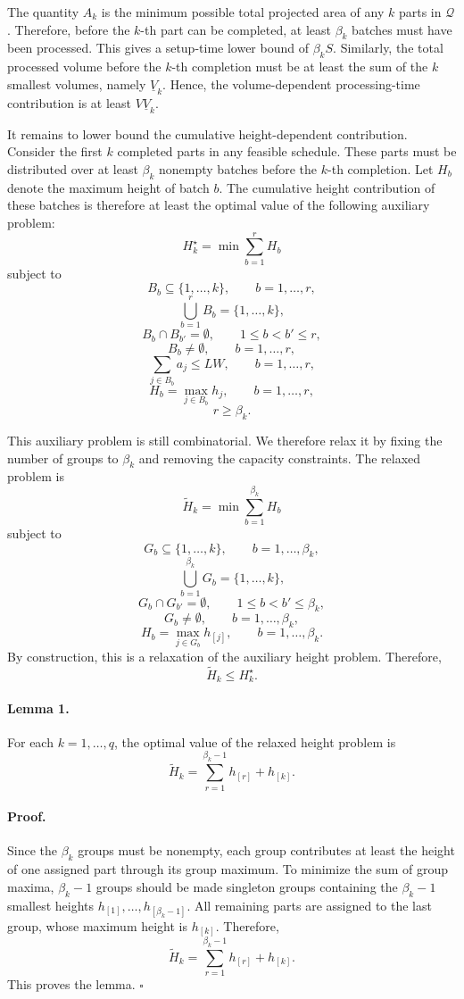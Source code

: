 \documentclass[letterpaper, 10 pt, conference]{ieeeconf}  %
\newcounter{lemma}
\begin{document}
The quantity $A_k$ is the minimum possible total projected area of any
$k$ parts in $\mathcal{Q}$. Therefore, before the $k$-th part can be
completed, at least $\beta_k$ batches must have been processed. This gives
a setup-time lower bound of $\beta_k S$. Similarly, the total processed
volume before the $k$-th completion must be at least the sum of the
$k$ smallest volumes, namely $\underline{V}_k$. Hence, the volume-dependent
processing-time contribution is at least $V\underline{V}_k$.

It remains to lower bound the cumulative height-dependent contribution.
Consider the first $k$ completed parts in any feasible schedule. These
parts must be distributed over at least $\beta_k$ nonempty batches before
the $k$-th completion. Let $H_b$ denote the maximum height of batch $b$.
The cumulative height contribution of these batches is therefore at least
the optimal value of the following auxiliary problem:
\[
H_k^{\star}
=
\min
\sum_{b=1}^{r}H_b
\]
subject to
\[
B_b\subseteq\{1,\dots,k\},\qquad b=1,\dots,r,
\]
\[
\bigcup_{b=1}^{r}B_b=\{1,\dots,k\},
\]
\[
B_b\cap B_{b'}=\emptyset,\qquad 1\le b<b'\le r,
\]
\[
B_b\neq\emptyset,\qquad b=1,\dots,r,
\]
\[
\sum_{j\in B_b}a_j\le LW,\qquad b=1,\dots,r,
\]
\[
H_b=\max_{j\in B_b}h_j,\qquad b=1,\dots,r,
\]
\[
r\ge \beta_k.
\]

This auxiliary problem is still combinatorial. We therefore relax it by
fixing the number of groups to $\beta_k$ and removing the capacity
constraints. The relaxed problem is
\[
\widetilde{H}_k
=
\min
\sum_{b=1}^{\beta_k}H_b
\]
subject to
\[
G_b\subseteq\{1,\dots,k\},\qquad b=1,\dots,\beta_k,
\]
\[
\bigcup_{b=1}^{\beta_k}G_b=\{1,\dots,k\},
\]
\[
G_b\cap G_{b'}=\emptyset,\qquad 1\le b<b'\le \beta_k,
\]
\[
G_b\neq\emptyset,\qquad b=1,\dots,\beta_k,
\]
\[
H_b=\max_{j\in G_b}h_{[j]},\qquad b=1,\dots,\beta_k.
\]
By construction, this is a relaxation of the auxiliary height problem.
Therefore,
\[
\widetilde{H}_k\le H_k^{\star}.
\]

\paragraph*{Lemma 1.}
For each $k=1,\dots,q$, the optimal value of the relaxed height problem is
\[
\widetilde{H}_k
=
\sum_{r=1}^{\beta_k-1}h_{[r]}+h_{[k]}.
\]

\paragraph*{Proof.}
Since the $\beta_k$ groups must be nonempty, each group contributes at least
the height of one assigned part through its group maximum. To minimize the
sum of group maxima, $\beta_k-1$ groups should be made singleton groups
containing the $\beta_k-1$ smallest heights
$h_{[1]},\dots,h_{[\beta_k-1]}$. All remaining parts are assigned to the last
group, whose maximum height is $h_{[k]}$. Therefore,
\[
\widetilde{H}_k
=
\sum_{r=1}^{\beta_k-1}h_{[r]}+h_{[k]}.
\]
This proves the lemma.
\hfill $\square$
\end{document}
